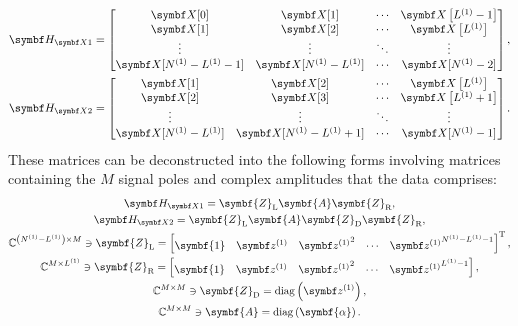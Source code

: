 \begin{subequations}
   \begin{gather}
        \HXone =
        \begin{bmatrix}
            \bX[0] & \bX[1] & \cdots & \bX\left[\Lone-1\right] \\
            \bX[1] & \bX[2] & \cdots & \bX\left[\Lone\right] \\
            \vdots & \vdots & \ddots & \vdots\\
            \bX[\None-\Lone-1] & \bX[\None-\Lone] & \cdots & \bX[\None-2]\\
        \end{bmatrix}, \\
        \HXtwo =
        \begin{bmatrix}
            \bX[1] & \bX[2] & \cdots & \bX\left[\Lone\right] \\
            \bX[2] & \bX[3] & \cdots & \bX\left[\Lone+1\right] \\
            \vdots & \vdots & \ddots & \vdots\\
            \bX[\None-\Lone] & \bX[\None-\Lone+1] & \cdots & \bX[\None-1]\\
        \end{bmatrix}.
   \end{gather}
\end{subequations}
These matrices can be deconstructed into the following forms involving matrices
containing the $M$ signal poles and complex amplitudes that the data comprises:
\begin{subequations}
   \begin{gather}
       \HXone = \symbf{Z}_{\text{L}} \symbf{A} \symbf{Z}_{\text{R}},\\
       \HXtwo = \symbf{Z}_{\text{L}} \symbf{A} \symbf{Z}_{\text{D}} \symbf{Z}_{\text{R}},\\
       \mathbb{C}^{\left(\None - \Lone\right) \times M} \ni
       \symbf{Z}_{\text{L}} =
       \begin{bmatrix}
           \symbf{1} &
           \bdzone &
           {\bdzone}^2 &
           \cdots &
            {\bdzone}^{\None-\Lone-1}
        \end{bmatrix}\T,\\
        \mathbb{C}^{M \times \Lone} \ni
        \symbf{Z}_{\text{R}} =
           \begin{bmatrix}
               \symbf{1} & \bdzone & {\bdzone}^{2} & \cdots & {\bdzone}^{\Lone-1}
           \end{bmatrix} ,\\
        \mathbb{C}^{M \times M} \ni
        \symbf{Z}_{\text{D}} = \diag\left(\bdzone\right), \label{eq:ZD}\\
        \mathbb{C}^{M \times M} \ni
        \symbf{A} = \diag\left(\symbf{\alpha}\right).\label{eq:A}
   \end{gather}
    \label{eq:HX-decomp}
\end{subequations}

